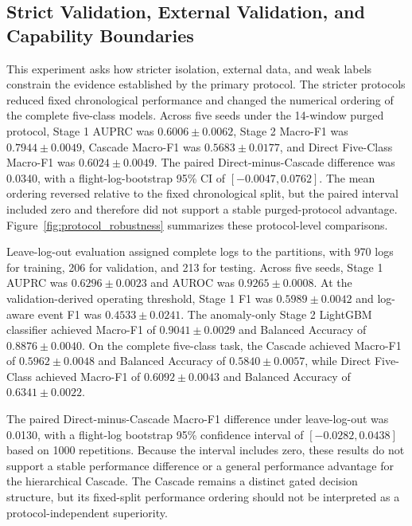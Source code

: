 \subsection{Strict Validation, External Validation, and Capability Boundaries}
\label{sec:strict_validation_results}

This experiment asks how stricter isolation, external data, and weak labels constrain the evidence established by the primary protocol. The stricter protocols reduced fixed chronological performance and changed the numerical ordering of the complete five-class models. Across five seeds under the 14-window purged protocol, Stage 1 AUPRC was $0.6006 \pm 0.0062$, Stage 2 Macro-F1 was $0.7944 \pm 0.0049$, Cascade Macro-F1 was $0.5683 \pm 0.0177$, and Direct Five-Class Macro-F1 was $0.6024 \pm 0.0049$. The paired Direct-minus-Cascade difference was 0.0340, with a flight-log-bootstrap 95\% CI of $[-0.0047, 0.0762]$. The mean ordering reversed relative to the fixed chronological split, but the paired interval included zero and therefore did not support a stable purged-protocol advantage. Figure~\ref{fig:protocol_robustness} summarizes these protocol-level comparisons.

Leave-log-out evaluation assigned complete logs to the partitions, with 970 logs for training, 206 for validation, and 213 for testing. Across five seeds, Stage 1 AUPRC was $0.6296 \pm 0.0023$ and AUROC was $0.9265 \pm 0.0008$. At the validation-derived operating threshold, Stage 1 F1 was $0.5989 \pm 0.0042$ and log-aware event F1 was $0.4533 \pm 0.0241$. The anomaly-only Stage 2 LightGBM classifier achieved Macro-F1 of $0.9041 \pm 0.0029$ and Balanced Accuracy of $0.8876 \pm 0.0040$. On the complete five-class task, the Cascade achieved Macro-F1 of $0.5962 \pm 0.0048$ and Balanced Accuracy of $0.5840 \pm 0.0057$, while Direct Five-Class achieved Macro-F1 of $0.6092 \pm 0.0043$ and Balanced Accuracy of $0.6341 \pm 0.0022$.

The paired Direct-minus-Cascade Macro-F1 difference under leave-log-out was 0.0130, with a flight-log bootstrap 95\% confidence interval of $[-0.0282, 0.0438]$ based on 1000 repetitions. Because the interval includes zero, these results do not support a stable performance difference or a general performance advantage for the hierarchical Cascade. The Cascade remains a distinct gated decision structure, but its fixed-split performance ordering should not be interpreted as a protocol-independent superiority.

